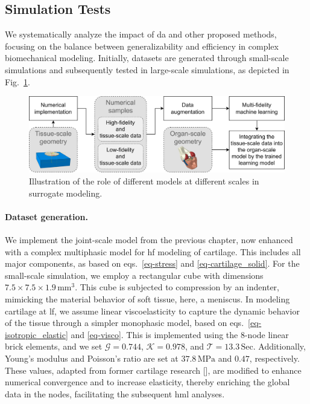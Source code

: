 \subsection{Simulation Tests}
%
We systematically analyze the impact of \ac{da} and other proposed methods, focusing on the balance between generalizability and efficiency in complex biomechanical modeling. Initially, datasets are generated through small-scale simulations and subsequently tested in large-scale simulations, as depicted in Fig.~\ref{fig:inductive}.

%
\begin{figure}\centering
\includegraphics[width=1\linewidth,keepaspectratio]{inductive.png}
\caption{Illustration of the role of different models at different scales in surrogate modeling.}\label{fig:inductive}
\end{figure}

\paragraph{Dataset generation.} We implement the joint-scale model from the previous chapter, now enhanced with a complex multiphasic model for \ac{hf} modeling of cartilage. This includes all major components, as based on eqs.~\ref{eq-stress} and \ref{eq-cartilage_solid}. For the small-scale simulation, we employ a rectangular cube with dimensions $7.5\times7.5\times1.9\, \text{mm}^3$. This cube is subjected to compression by an indenter, mimicking the material behavior of soft tissue, here, a meniscus. In modeling cartilage at \ac{lf}, we assume linear viscoelasticity to capture the dynamic behavior of the tissue through a simpler monophasic model, based on eqs.~\ref{eq-isotropic_elastic} and \ref{eq-visco}. This is implemented using the 8-node linear brick elements, and we set $\mathcal{G}=0.744$, $\mathcal{K}=0.978$, and $\mathcal{T}=13.3\,\text{Sec}$. Additionally, Young's modulus and Poisson's ratio are set at $37.8\,\text{MPa}$ and $0.47$, respectively. These values, adapted from former cartilage research [\cite{keenan2013}], are modified to enhance numerical convergence and to increase elasticity, thereby enriching the global data in the nodes, facilitating the subsequent \ac{hml} analyses.

